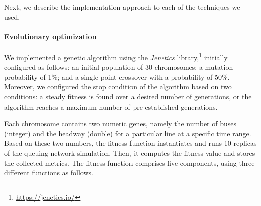 Next, we describe the implementation approach to each of the techniques we used.

\paragraph{Evolutionary optimization}
\label{par:evaluation--suts-evolutionary-optimization}

We implemented a genetic algorithm using the \textit{Jenetics} library,\footnote{\url{https://jenetics.io/}} initially configured as follows: an initial population of 30 chromosomes; a mutation probability of 1\%; and a single-point crossover with a probability of 50\%. Moreover, we configured the stop condition of the algorithm based on two conditions: a steady fitness is found over a desired number of generations, or the algorithm reaches a maximum number of pre-established generations.

Each chromosome contains two numeric genes, namely the number of buses (integer) and the headway (double) for a particular line at a specific time range. Based on these two numbers, the fitness function instantiates and runs 10 replicas of the queuing network simulation. Then, it computes the fitness value and stores the collected metrics. The fitness function comprises five components, using three different functions as follows.

